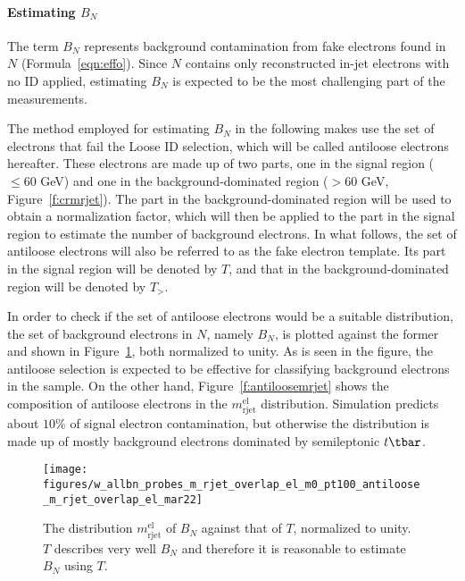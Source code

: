 
\paragraph{Estimating $B_N$} The term $B_N$ represents background contamination
from fake electrons found in $N$ (Formula~\ref{eqn:effo}). Since $N$ contains
only reconstructed in-jet electrons with no ID applied, estimating $B_N$ is
expected to be the most challenging part of the measurements.

The method employed for estimating $B_N$ in the following makes use the set of
electrons that fail the Loose ID selection, which will be called antiloose
electrons hereafter. These electrons are made up of two parts, one in the
signal region ($\leq 60$ GeV) and one in the background-dominated region ($>
	60$ GeV, Figure~\ref{f:crmrjet}). The part in the background-dominated region
will be used to obtain a normalization factor, which will then be applied to
the part in the signal region to estimate the number of background electrons.
In what follows, the set of antiloose electrons will also be referred to as the
fake electron template. Its part in the signal region will be denoted by $T$,
and that in the background-dominated region will be denoted by $T_>$.

In order to check if the set of antiloose electrons would be a suitable
distribution, the set of background electrons in $N$, namely $B_N$, is plotted
against the former and shown in Figure~\ref{f:shapebeforeafter}, both
normalized to unity. As is seen in the figure, the antiloose selection is
expected to be effective for classifying background electrons in the sample. On
the other hand, Figure~\ref{f:antiloosemrjet} shows the composition of
antiloose electrons in the $m_{\text{rjet}}^{\text{el}}$ distribution.
Simulation predicts about $10\%$ of signal electron contamination, but
otherwise the distribution is made up of mostly background electrons
dominated by semileptonic $t\tbar$.


\begin{figure}[H]
	\texttt{[image: figures/w\_allbn\_probes\_m\_rjet\_overlap\_el\_m0\_pt100\_antiloose\_m\_rjet\_overlap\_el\_mar22]}
	\centering
	\caption{The distribution $m_{\text{rjet}}^{\text{el}}$ of $B_N$ against that
		of $T$, normalized to unity. $T$ describes very well $B_N$ and therefore it is
		reasonable to estimate $B_N$ using $T$.}
	\label{f:shapebeforeafter}
\end{figure}

